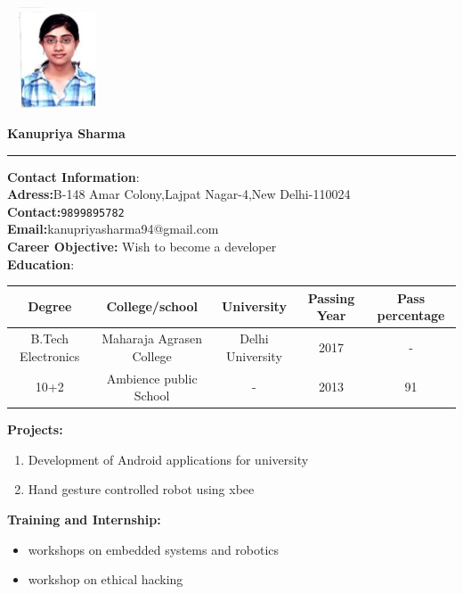 \documentclass[10pt,a4paper]{article}
\begin{document}
	
\begin{flushright}
\includegraphics[width=3cm, height=3cm]{Untitled}
\end{flushright}

\textbf{\huge \bigskip Kanupriya Sharma}
\hrule
\large
\begin{flushleft}
	
	\textbf{Contact Information}:\\
	\textbf{Adress:}B-148 Amar Colony,Lajpat Nagar-4,New Delhi-110024\\
	\textbf{Contact:}\texttt{9899895782}\\
	\textbf{Email:}kanupriyasharma94@gmail.com\\ 
	\textbf{Career Objective:} Wish to become a  developer\\
	
	\textbf{\bigskip  Education}:\\
	
	\begin{tabular}{|c|c|c|c|c|}
		\hline \textbf{ Degree}  & \textbf{College/school}  & \textbf{University} & \textbf{Passing Year} & \textbf{ Pass percentage} \\ 
		\hline B.Tech Electronics & Maharaja Agrasen College  & Delhi University & 2017 & - \\ 
		\hline 
		10+2 & Ambience public School & - & 2013 & 91 \\
		\hline
		
	\end{tabular} 
	
	\bigskip
	
	\textbf{Projects:}\\
	\begin{enumerate}
		\item  Development of Android applications for university
		\item  Hand gesture controlled robot using xbee
	\end{enumerate}
	\textbf{Training and Internship:}\\
	\begin{itemize}
		\item  workshops on embedded systems and robotics\\
		\item  workshop on ethical hacking\\
	\end{itemize}
	

\end{flushleft}
\end{document}
